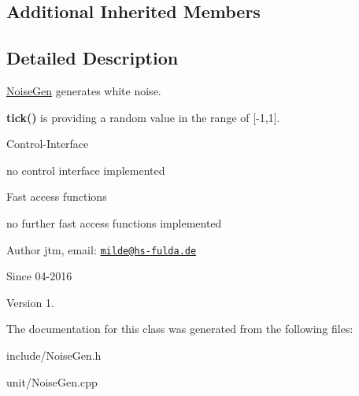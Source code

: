\subsection*{Additional Inherited Members}


\subsection{Detailed Description}
\hyperlink{classunit_1_1NoiseGen}{Noise\+Gen} generates white noise.


\begin{DoxyItemize}
\item {\bfseries tick()} is providing a random value in the range of \mbox{[}-\/1,1\mbox{]}.
\end{DoxyItemize}

Control-\/\+Interface
\begin{DoxyItemize}
\item no control interface implemented
\end{DoxyItemize}

Fast access functions
\begin{DoxyItemize}
\item no further fast access functions implemented
\end{DoxyItemize}

\begin{DoxyAuthor}{Author}
jtm, email\+:  \href{mailto:milde@hs-fulda.de}{\tt milde@hs-\/fulda.\+de} 
\end{DoxyAuthor}
\begin{DoxySince}{Since}
04-\/2016 
\end{DoxySince}
\begin{DoxyVersion}{Version}
1. 
\end{DoxyVersion}


The documentation for this class was generated from the following files\+:\begin{DoxyCompactItemize}
\item 
include/Noise\+Gen.\+h\item 
unit/Noise\+Gen.\+cpp\end{DoxyCompactItemize}

